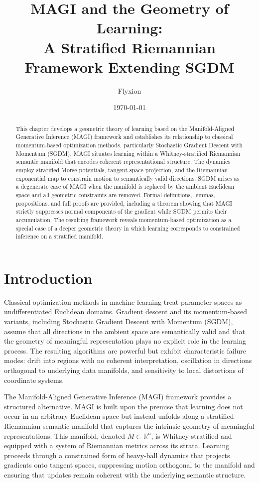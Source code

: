 \documentclass[12pt]{article}
\title{MAGI and the Geometry of Learning:\\
A Stratified Riemannian Framework Extending SGDM}
\author{Flyxion}
\date{\today}
\begin{document}
\maketitle

\begin{abstract}
This chapter develops a geometric theory of learning based on the Manifold-Aligned Generative Inference (MAGI) framework and establishes its relationship to classical momentum-based optimization methods, particularly Stochastic Gradient Descent with Momentum (SGDM). MAGI situates learning within a Whitney-stratified Riemannian semantic manifold that encodes coherent representational structure. The dynamics employ stratified Morse potentials, tangent-space projection, and the Riemannian exponential map to constrain motion to semantically valid directions. SGDM arises as a degenerate case of MAGI when the manifold is replaced by the ambient Euclidean space and all geometric constraints are removed. Formal definitions, lemmas, propositions, and full proofs are provided, including a theorem showing that MAGI strictly suppresses normal components of the gradient while SGDM permits their accumulation. The resulting framework reveals momentum-based optimization as a special case of a deeper geometric theory in which learning corresponds to constrained inference on a stratified manifold.
\end{abstract}

\section{Introduction}

Classical optimization methods in machine learning treat parameter spaces as undifferentiated Euclidean domains. Gradient descent and its momentum-based variants, including Stochastic Gradient Descent with Momentum (SGDM), assume that all directions in the ambient space are semantically valid and that the geometry of meaningful representation plays no explicit role in the learning process. The resulting algorithms are powerful but exhibit characteristic failure modes: drift into regions with no coherent interpretation, oscillation in directions orthogonal to underlying data manifolds, and sensitivity to local distortions of coordinate systems.

The Manifold-Aligned Generative Inference (MAGI) framework provides a structured alternative. MAGI is built upon the premise that learning does not occur in an arbitrary Euclidean space but instead unfolds along a stratified Riemannian semantic manifold that captures the intrinsic geometry of meaningful representations. This manifold, denoted $M \subset \mathbb{R}^n$, is Whitney-stratified and equipped with a system of Riemannian metrics across its strata. Learning proceeds through a constrained form of heavy-ball dynamics that projects gradients onto tangent spaces, suppressing motion orthogonal to the manifold and ensuring that updates remain coherent with the underlying semantic structure.
\end{document}
